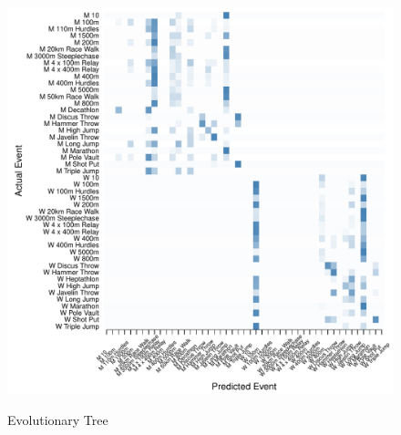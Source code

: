 \begin{figure}
\begin{center}
\begin{minipage}{0.20\textwidth}
\begin{center}
    \end{center}
  \end{minipage}
  \hspace{0.05\textwidth}
  \begin{minipage}{0.20\textwidth}
    \begin{center}
      \includegraphics[scale=0.20]{../graphics/athletesCIT-tst.pdf}
    \end{center}
  \end{minipage}



    Evolutionary Tree \\


\end{center}
\end{figure}
